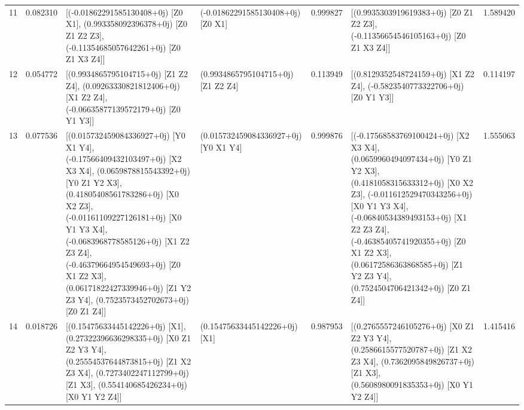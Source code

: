 \begin{tabular}{rrllrlr}
      11 &      0.082310 &                                                                                                                                                                                                                                              [(-0.01862291585130408+0j) [Z0 X1], (0.993358092396378+0j) [Z0 Z1 Z2 Z3], (-0.11354685057642261+0j) [Z0 Z1 X3 Z4]] &            (-0.01862291585130408+0j) [Z0 X1] &      0.999827 &                                                                                                                                                                                                                                           [(0.9935303919619383+0j) [Z0 Z1 Z2 Z3], (-0.11356654546105163+0j) [Z0 Z1 X3 Z4]] &  1.589420 \\
      12 &      0.054772 &                                                                                                                                                                                                                                                 [(0.9934865795104715+0j) [Z1 Z2 Z4], (0.09263330821812406+0j) [X1 Z2 Z4], (-0.06635877139572179+0j) [Z0 Y1 Y3]] &           (0.9934865795104715+0j) [Z1 Z2 Z4] &      0.113949 &                                                                                                                                                                                                                                                  [(0.8129352548724159+0j) [X1 Z2 Z4], (-0.5823540773322706+0j) [Z0 Y1 Y3]] &  0.114197 \\
      13 &      0.077536 &  [(0.015732459084336927+0j) [Y0 X1 Y4], (-0.17566409432103497+0j) [X2 X3 X4], (0.0659878815543392+0j) [Y0 Z1 Y2 X3], (0.41805408561783286+0j) [X0 X2 Z3], (-0.01161109227126181+0j) [X0 Y1 Y3 X4], (-0.0683968778585126+0j) [X1 Z2 Z3 Z4], (-0.46379664954549693+0j) [Z0 X1 Z2 X3], (0.06171822427339946+0j) [Z1 Y2 Z3 Y4], (0.7523573452702673+0j) [Z0 Z1 Z4]] &         (0.015732459084336927+0j) [Y0 X1 Y4] &      0.999876 &  [(-0.17568583769100424+0j) [X2 X3 X4], (0.0659960494097434+0j) [Y0 Z1 Y2 X3], (0.4181058315633312+0j) [X0 X2 Z3], (-0.011612529470343256+0j) [X0 Y1 Y3 X4], (-0.06840534389493153+0j) [X1 Z2 Z3 Z4], (-0.46385405741920355+0j) [Z0 X1 Z2 X3], (0.06172586363868585+0j) [Z1 Y2 Z3 Y4], (0.7524504706421342+0j) [Z0 Z1 Z4]] &  1.555063 \\
      14 &      0.018726 &                                                                                                                                                                       [(0.15475633445142226+0j) [X1], (0.27322396636298335+0j) [X0 Z1 Z2 Y3 Y4], (0.25554537644873815+0j) [Z1 X2 Z3 X4], (0.7273402247112799+0j) [Z1 X3], (0.554140685426234+0j) [X0 Y1 Y2 Z4]] &                (0.15475633445142226+0j) [X1] &      0.987953 &                                                                                                                                                                  [(0.2765557246105276+0j) [X0 Z1 Z2 Y3 Y4], (0.2586615577520787+0j) [Z1 X2 Z3 X4], (0.7362095849826737+0j) [Z1 X3], (0.5608980091835353+0j) [X0 Y1 Y2 Z4]] &  1.415416 \\

\end{tabular}
